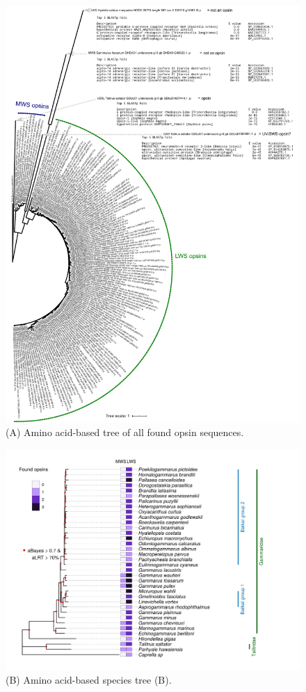 \documentclass{article}
\begin{document}
\begin{figure}[H] 
	\vskip -18mm
	\includegraphics[scale=0.85]{FigS2a_opsin_tree.pdf}
	\caption{(A) Amino acid-based tree of all found opsin sequences.} 
\end{figure}

\begin{figure}[H] 
	\ContinuedFloat
	\includegraphics[scale=0.85]{FigS2_aa_tree.png}
	\caption{(B) Amino acid-based species tree (B).} 
\end{figure}
\end{document}
